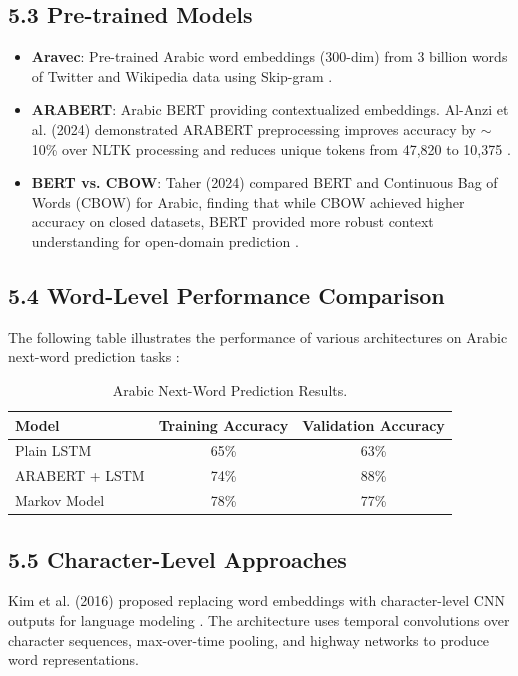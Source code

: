 \documentclass{article}
\begin{document}
\subsection*{5.3 Pre-trained Models}
\begin{itemize}
    \item \textbf{Aravec}: Pre-trained Arabic word embeddings (300-dim) from 3 billion words of Twitter and Wikipedia data using Skip-gram \cite{habib2021predictive}.
    \item \textbf{ARABERT}: Arabic BERT providing contextualized embeddings. Al-Anzi et al. (2024) demonstrated ARABERT preprocessing improves accuracy by $\sim$10\% over NLTK processing and reduces unique tokens from 47,820 to 10,375 \cite{alanzi2024revealing}.
    \item \textbf{BERT vs. CBOW}: Taher (2024) compared BERT and Continuous Bag of Words (CBOW) for Arabic, finding that while CBOW achieved higher accuracy on closed datasets, BERT provided more robust context understanding for open-domain prediction \cite{taher2024arabic}.
\end{itemize}

\subsection*{5.4 Word-Level Performance Comparison}
The following table illustrates the performance of various architectures on Arabic next-word prediction tasks \cite{alanzi2024revealing}:

\begin{table}[H]
    \centering
    \renewcommand{\arraystretch}{1.2}
    \begin{tabular}{lcc}
        \toprule
        \textbf{Model} & \textbf{Training Accuracy} & \textbf{Validation Accuracy} \\
        \midrule
        Plain LSTM & 65\% & 63\% \\
        ARABERT + LSTM & 74\% & 88\% \\
        Markov Model & 78\% & 77\% \\
        \bottomrule
    \end{tabular}
    \caption{Arabic Next-Word Prediction Results.}
    \label{tab:nwp_results}
\end{table}

\subsection*{5.5 Character-Level Approaches}
Kim et al. (2016) proposed replacing word embeddings with character-level CNN outputs for language modeling \cite{kim2016character}. The architecture uses temporal convolutions over character sequences, max-over-time pooling, and highway networks to produce word representations.
\end{document}

